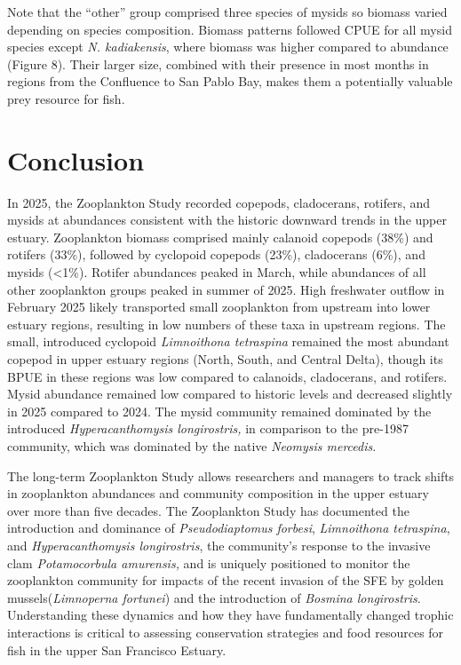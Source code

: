 \documentclass[
  letterpaper,
]{article}
\begin{document}
Note that the ``other'' group comprised three species of mysids so
biomass varied depending on species composition. Biomass patterns
followed CPUE for all mysid species except \emph{N. kadiakensis}, where
biomass was higher compared to abundance (Figure 8). Their larger size,
combined with their presence in most months in regions from the
Confluence to San Pablo Bay, makes them a potentially valuable prey
resource for fish.

\section{Conclusion}\label{conclusion}

In 2025, the Zooplankton Study recorded copepods, cladocerans, rotifers,
and mysids at abundances consistent with the historic downward trends in
the upper estuary. Zooplankton biomass comprised mainly calanoid
copepods (38\%) and rotifers (33\%), followed by cyclopoid copepods
(23\%), cladocerans (6\%), and mysids (\textless1\%). Rotifer abundances
peaked in March, while abundances of all other zooplankton groups peaked
in summer of 2025. High freshwater outflow in February 2025 likely
transported small zooplankton from upstream into lower estuary regions,
resulting in low numbers of these taxa in upstream regions. The small,
introduced cyclopoid \emph{Limnoithona tetraspina} remained the most
abundant copepod in upper estuary regions (North, South, and Central
Delta), though its BPUE in these regions was low compared to calanoids,
cladocerans, and rotifers. Mysid abundance remained low compared to
historic levels and decreased slightly in 2025 compared to 2024. The
mysid community remained dominated by the introduced
\emph{Hyperacanthomysis longirostris,} in comparison to the pre-1987
community, which was dominated by the native \emph{Neomysis mercedis}.

The long-term Zooplankton Study allows researchers and managers to track
shifts in zooplankton abundances and community composition in the upper
estuary over more than five decades. The Zooplankton Study has
documented the introduction and dominance of \emph{Pseudodiaptomus
forbesi}, \emph{Limnoithona tetraspina}, and \emph{Hyperacanthomysis
longirostris}, the community's response to the invasive clam
\emph{Potamocorbula amurensis,} and is uniquely positioned to monitor
the zooplankton community for impacts of the recent invasion of the SFE
by golden mussels(\emph{Limnoperna fortunei}) and the introduction of
\emph{Bosmina longirostris}. Understanding these dynamics and how they
have fundamentally changed trophic interactions is critical to assessing
conservation strategies and food resources for fish in the upper San
Francisco Estuary.
\end{document}
